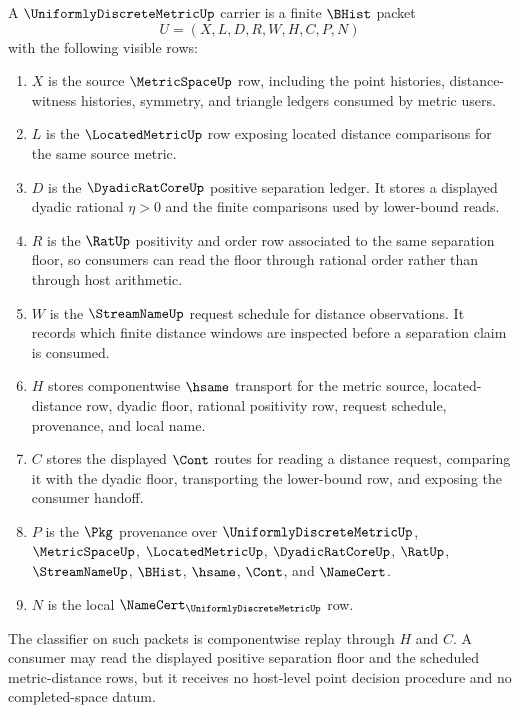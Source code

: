 \begin{definition}
\label{def:uniformly-discrete-metric-carrier}
A $\UniformlyDiscreteMetricUp$ carrier is a finite $\BHist$ packet
$$
U=(X,L,D,R,W,H,C,P,N)
$$
with the following visible rows:
\begin{enumerate}
\item $X$ is the source $\MetricSpaceUp$ row, including the point histories, distance-witness histories, symmetry, and triangle ledgers consumed by metric users.
\item $L$ is the $\LocatedMetricUp$ row exposing located distance comparisons for the same source metric.
\item $D$ is the $\DyadicRatCoreUp$ positive separation ledger. It stores a displayed dyadic rational $\eta>0$ and the finite comparisons used by lower-bound reads.
\item $R$ is the $\RatUp$ positivity and order row associated to the same separation floor, so consumers can read the floor through rational order rather than through host arithmetic.
\item $W$ is the $\StreamNameUp$ request schedule for distance observations. It records which finite distance windows are inspected before a separation claim is consumed.
\item $H$ stores componentwise $\hsame$ transport for the metric source, located-distance row, dyadic floor, rational positivity row, request schedule, provenance, and local name.
\item $C$ stores the displayed $\Cont$ routes for reading a distance request, comparing it with the dyadic floor, transporting the lower-bound row, and exposing the consumer handoff.
\item $P$ is the $\Pkg$ provenance over $\UniformlyDiscreteMetricUp$, $\MetricSpaceUp$, $\LocatedMetricUp$, $\DyadicRatCoreUp$, $\RatUp$, $\StreamNameUp$, $\BHist$, $\hsame$, $\Cont$, and $\NameCert$.
\item $N$ is the local $\NameCert_{\UniformlyDiscreteMetricUp}$ row.
\end{enumerate}
The classifier on such packets is componentwise replay through $H$ and $C$. A consumer may read the displayed positive separation floor and the scheduled metric-distance rows, but it receives no host-level point decision procedure and no completed-space datum.
\end{definition}

